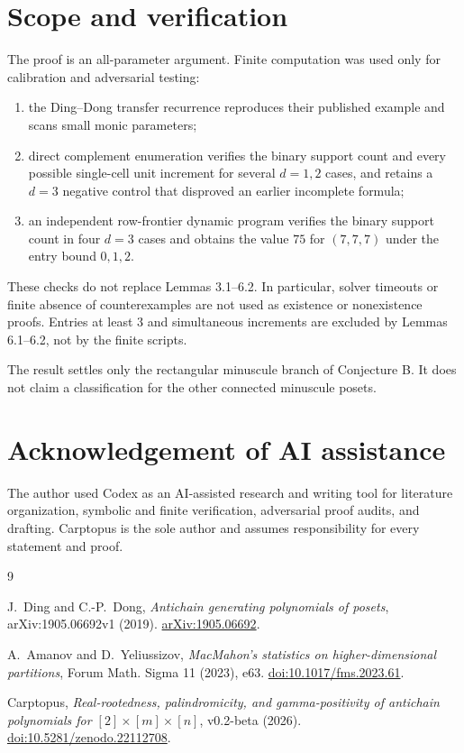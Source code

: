 \documentclass[11pt]{article}
\numberwithin{equation}{section}
\begin{document}
\section{Scope and verification}


The proof is an all-parameter argument. Finite computation was used only for
calibration and adversarial testing:

\begin{enumerate}
\item the Ding--Dong transfer recurrence reproduces their published example and
scans small monic parameters;
\item direct complement enumeration verifies the binary support count and every
possible single-cell unit increment for several $d=1,2$ cases, and retains
a $d=3$ negative control that disproved an earlier incomplete formula;
\item an independent row-frontier dynamic program verifies the binary support
count in four $d=3$ cases and obtains the value $75$ for $(7,7,7)$ under
the entry bound $0,1,2$.

\end{enumerate}

These checks do not replace Lemmas 3.1--6.2. In particular, solver timeouts or
finite absence of counterexamples are not used as existence or nonexistence
proofs. Entries at least $3$ and simultaneous increments are excluded by
Lemmas 6.1--6.2, not by the finite scripts.

The result settles only the rectangular minuscule branch of Conjecture B. It
does not claim a classification for the other connected minuscule posets.

\section*{Acknowledgement of AI assistance}


The author used Codex as an AI-assisted research and writing tool for
literature organization, symbolic and finite verification, adversarial proof
audits, and drafting. Carptopus is the sole author and assumes responsibility
for every statement and proof.

\begin{thebibliography}{9}
\footnotesize
\raggedright

J.~Ding and C.-P.~Dong,
\emph{Antichain generating polynomials of posets},
arXiv:1905.06692v1 (2019).
\href{https://arxiv.org/abs/1905.06692}{arXiv:1905.06692}.

A.~Amanov and D.~Yeliussizov,
\emph{MacMahon's statistics on higher-dimensional partitions},
Forum Math. Sigma 11 (2023), e63.
\href{https://doi.org/10.1017/fms.2023.61}{doi:10.1017/fms.2023.61}.

Carptopus,
\emph{Real-rootedness, palindromicity, and gamma-positivity of antichain
polynomials for $[2]\times[m]\times[n]$},
v0.2-beta (2026).
\href{https://doi.org/10.5281/zenodo.22112708}{doi:10.5281/zenodo.22112708}.

\end{thebibliography}
\end{document}
